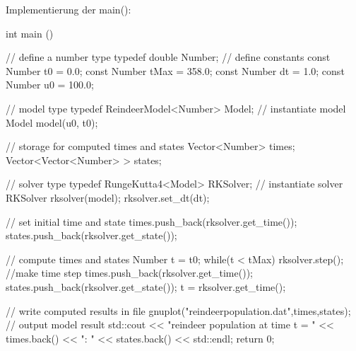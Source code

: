 \documentclass[10pt,oneside,a4paper]{scrartcl}
\begin{document}
        \newpage
        Implementierung der main():\\
        \begin{cppcode}
int main () {
  // define a number type
  typedef double Number;
  // define constants
  const Number t0 = 0.0;
  const Number tMax = 358.0;
  const Number dt = 1.0;
  const Number u0 = 100.0;

  // model type
  typedef ReindeerModel<Number> Model;
  // instantiate model
  Model model(u0, t0);

  // storage for computed times and states
  Vector<Number> times;
  Vector<Vector<Number> > states;

  // solver type
  typedef RungeKutta4<Model> RKSolver;
  // instantiate solver
  RKSolver rksolver(model);
  rksolver.set_dt(dt);

  // set initial time and state
  times.push_back(rksolver.get_time());
  states.push_back(rksolver.get_state());

  // compute times and states
  Number t = t0;
  while(t < tMax){
    rksolver.step(); //make time step
    times.push_back(rksolver.get_time());
    states.push_back(rksolver.get_state());
    t = rksolver.get_time();
  }

  // write computed results in file
  gnuplot("reindeerpopulation.dat",times,states); // output model result
  std::cout << "reindeer population at time t = " << times.back() << ": " << states.back() << std::endl;
  return 0;
}
        
        \end{cppcode}
\end{document}
